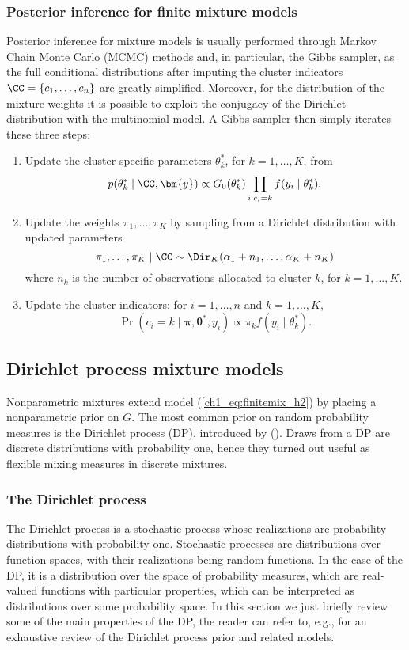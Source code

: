\subsubsection*{Posterior inference for finite mixture models}
Posterior inference for mixture models is usually performed through Markov Chain Monte Carlo (MCMC) methods and, in particular, the Gibbs sampler, as the full conditional distributions after imputing the cluster indicators $\CC = \{c_1,\dots,c_n\}$ are greatly simplified.
Moreover, for the distribution of the mixture weights it is possible to exploit the conjugacy of the Dirichlet distribution with the multinomial model. A Gibbs sampler then simply iterates these three steps:
\begin{enumerate}
	\item Update the cluster-specific parameters $\theta^*_k$, for $k=1,\dots,K$, from
	$$ p(\theta^*_k \mid \CC, \bm{y}) \propto G_0(\theta^*_k) \prod_{i:c_i=k} f(y_i\mid\theta^*_{k}). $$
	\item Update the weights $\pi_1,\dots,\pi_K$ by sampling from a Dirichlet distribution with updated parameters
	$$ \pi_1,\dots,\pi_K\mid \CC \sim  \Dir_K(\alpha_1 + n_1,\dots,\alpha_K + n_K) $$
	where $n_k$ is the number of observations allocated to cluster $k$, for $k=1,\dots,K$.
	\item Update the cluster indicators: for $i=1,\dots,n$ and $k=1,\dots,K$,
	$$ \Pr(c_i = k\mid \bm{\pi},\bm{\theta}^*, y_i) \propto \pi_k f(y_i\mid\theta^*_{k})  .$$
\end{enumerate}



\subsection{Dirichlet process mixture models}
Nonparametric mixtures extend model (\ref{ch1_eq:finitemix_h2}) by placing a nonparametric prior on $G$. The most common prior on random probability measures is the Dirichlet process (DP), introduced by \citeauthor{ferguson1973} (\citeyear{ferguson1973, ferguson1974}). Draws from a DP are discrete distributions with probability one, hence they turned out useful as flexible mixing measures in discrete mixtures.

\subsubsection*{The Dirichlet process }
\label{ch1_sec:DP}
The Dirichlet process is a stochastic process whose realizations are probability distributions with probability one. 
Stochastic processes are distributions over function spaces, with their realizations being random functions. In the case of the DP, it is a distribution over the space of probability measures, which are real-valued functions with particular properties, which can be interpreted as distributions over some probability space. In this section we just briefly review some of the main properties of the DP, the reader can refer to, e.g., \textcite{muller2015, hjort2010} for an exhaustive review of the Dirichlet process prior and related models.

